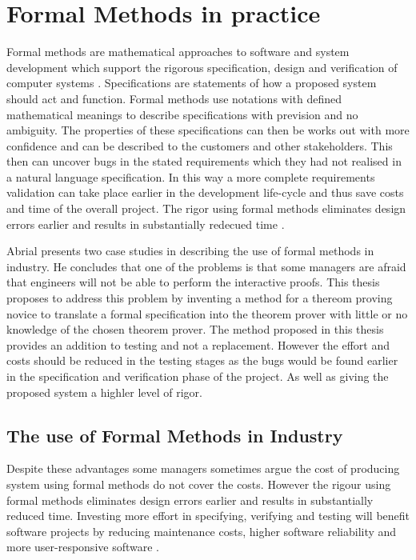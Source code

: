 \section{Formal Methods in practice}
\label{sec:formnot}

Formal methods are mathematical approaches to software and system development which support the rigorous specification, design and verification of computer systems \cite{fmeurope}. Specifications are statements of how a proposed system should act and function. Formal methods use notations with defined mathematical meanings to describe specifications with prevision and no ambiguity. The properties of these specifications can then be works out with more confidence and can be described to the customers and other stakeholders. This then can uncover bugs in the stated requirements which they had not realised in a natural language specification. In this way a more complete requirements validation can take place earlier in the development life-cycle and thus save costs and time of the overall project. The rigor using formal methods eliminates design errors earlier and results in substantially redecued time \cite{benefitsofform}. 

Abrial presents two case studies in \cite{10.1145/1134285.1134406} describing the use of formal methods in industry. He concludes that one of the problems is that some managers are afraid that engineers will not be able to perform the interactive proofs. This thesis proposes to address this problem by inventing a method for a thereom proving novice to translate a formal specification into the theorem prover with little or no knowledge of the chosen theorem prover. The method proposed in this thesis provides an addition to testing and not a replacement. However the effort and costs should be reduced in the testing stages as the bugs would be found earlier in the specification and verification phase of the project. As well as giving the proposed system a highler level of rigor.

\subsection{The use of Formal Methods in Industry}

Despite these advantages some managers sometimes argue the cost of producing system using formal methods do not cover the costs. However the rigour using formal methods eliminates design errors earlier and results in substantially reduced time. Investing more effort in specifying, verifying and testing will benefit software projects by reducing maintenance costs, higher software reliability and more user-responsive software \cite{chantatub}.

